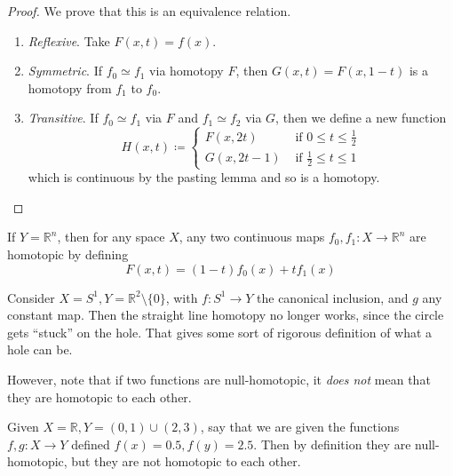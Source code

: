   \begin{proof}
    We prove that this is an equivalence relation. 
    \begin{enumerate}
      \item \textit{Reflexive}. Take $F(x, t) = f(x)$. 
      \item \textit{Symmetric}. If $f_0 \simeq f_1$ via homotopy $F$, then $G(x, t) = F(x, 1 - t)$ is a homotopy from $f_1$ to $f_0$. 
      \item \textit{Transitive}. If $f_0 \simeq f_1$ via $F$ and $f_1 \simeq f_2$ via $G$, then we define a new function 
        \begin{equation}
          H(x, t) \coloneqq \begin{cases} 
            F(x, 2t)  & \text{ if } 0 \leq t \leq \frac{1}{2} \\ 
            G(x, 2t - 1) & \text{ if } \frac{1}{2} \leq t \leq 1 
          \end{cases}
        \end{equation}
        which is continuous by the pasting lemma and so is a homotopy. 
    \end{enumerate}
  \end{proof} 

  \begin{example}
    If $Y = \mathbb{R}^n$, then for any space $X$, any two continuous maps $f_0, f_1: X \to \mathbb{R}^n$ are homotopic by defining 
    \begin{equation}
      F(x, t) = (1 - t) f_0 (x) + t f_1 (x) 
    \end{equation}
  \end{example}

  \begin{example}
    Consider $X = S^1, Y = \mathbb{R}^2 \setminus \{0\}$, with $f: S^1 \to Y$ the canonical inclusion, and $g$ any constant map. Then the straight line homotopy no longer works, since the circle gets ``stuck'' on the hole. That gives some sort of rigorous definition of what a hole can be. 
  \end{example}

  However, note that if two functions are null-homotopic, it \textit{does not} mean that they are homotopic to each other. 

  \begin{example}
    Given $X = \mathbb{R}, Y = (0, 1) \cup (2, 3)$, say that we are given the functions $f, g: X \to Y$ defined $f(x) = 0.5, f(y) = 2.5$. Then by definition they are null-homotopic, but they are not homotopic to each other. 
  \end{example}

